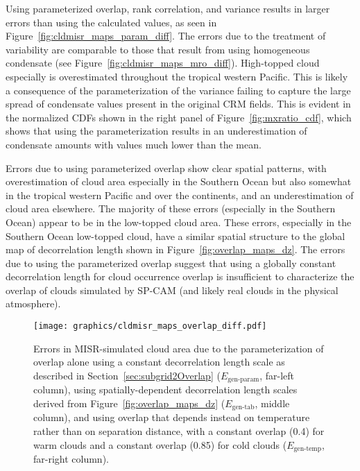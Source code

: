 Using parameterized overlap, rank correlation, and variance results in
larger errors than using the calculated values, as seen in
Figure~\ref{fig:cldmisr_maps_param_diff}. The errors due to the
treatment of variability are comparable to those that result from using
homogeneous condensate (see Figure~\ref{fig:cldmisr_maps_mro_diff}).
High-topped cloud especially is overestimated throughout the tropical
western Pacific. This is likely a consequence of the parameterization of
the variance failing to capture the large spread of condensate values
present in the original CRM fields. This is evident in the normalized
CDFs shown in the right panel of Figure~\ref{fig:mxratio_cdf}, which
shows that using the parameterization results in an underestimation of
condensate amounts with values much lower than the mean.

Errors due to using parameterized overlap show clear spatial patterns,
with overestimation of cloud area especially in the Southern Ocean but
also somewhat in the tropical western Pacific and over the continents,
and an underestimation of cloud area elsewhere. The majority of these
errors (especially in the Southern Ocean) appear to be in the low-topped
cloud area. These errors, especially in the Southern Ocean low-topped
cloud, have a similar spatial structure to the global map of
decorrelation length shown in Figure~\ref{fig:overlap_maps_dz}. The
errors due to using the parameterized overlap suggest that using a
globally constant decorrelation length for cloud occurrence overlap is
insufficient to characterize the overlap of clouds simulated by SP-CAM
(and likely real clouds in the physical atmosphere).

\begin{figure}[tp]
\centering
\texttt{[image: graphics/cldmisr\_maps\_overlap\_diff.pdf]}
\caption{\label{fig:cldmisr_maps_overlap_diff}Errors in MISR-simulated
cloud area due to the parameterization of overlap alone using a constant
decorrelation length scale as described in
Section~\ref{sec:subgrid2Overlap} (\(E_\textrm{gen-param}\), far-left
column), using spatially-dependent decorrelation length scales derived
from Figure~\ref{fig:overlap_maps_dz} (\(E_\textrm{gen-tab}\), middle
column), and using overlap that depends instead on temperature rather
than on separation distance, with a constant overlap (0.4) for warm
clouds and a constant overlap (0.85) for cold clouds
(\(E_\textrm{gen-temp}\), far-right
column).}\label{fig:cldmisrux5fmapsux5foverlapux5fdiff}
\end{figure}

